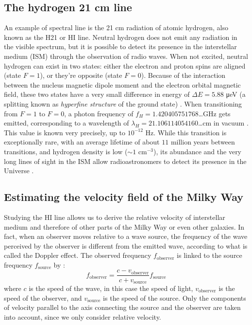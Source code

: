 \subsection{The hydrogen 21 cm line}
An example of spectral line is the 21 cm radiation of atomic hydrogen, also known as the H21 or HI line.
Neutral hydrogen does not emit any radiation in the visible spectrum, but it is possible to detect its presence in the interstellar medium (ISM) through the observation of radio waves.
When not excited, neutral hydrogen can exist in two states: either the electron and proton spins are aligned (state $F=1$), or they're opposite (state $F=0$).
Because of the interaction between the nucleus magnetic dipole moment and the electron orbital magnetic field, these two states have a very small difference in energy of $\Delta E = 5.88$ \si{\micro\electronvolt} (a splitting known as \emph{hyperfine structure} of the ground state) \cite{lauterbach_radio_2022}.
When transitioning from $F=1$ to $F=0$, a photon frequency of \mbox{$f_H = 1.420405751768$\ldots GHz} gets emitted, corresponding to a wavelength of \mbox{$\lambda_H = 21.106114054160$\ldots cm} in vacuum \cite{hellwig_measurement_1970}. This value is known very precisely, up to $10^{-12}$ Hz.
While this transition is exceptionally rare, with an average lifetime of about $11$ million years between transitions, and hydrogen density is low ($\sim 1$ cm$^{-3}$), its abundance and the very long lines of sight in the ISM allow radioastronomers to detect its presence in the Universe \cite{burke_introduction_2013}.

\subsection{Estimating the velocity field of the Milky Way}
Studying the HI line allows us to derive the relative velocity of interstellar medium and therefore of other parts of the Milky Way or even other galaxies.
In fact, when an observer moves relative to a wave source, the frequency of the wave perceived by the observer is different from the emitted wave, according to what is called the Doppler effect.
The observed frequency $f_\textrm{observer}$ is linked to the source frequency $f_\textrm{source}$ by \cite{alonso_fundamental_1983}:
\begin{equation}
    f_\textrm{observer} = \frac{c - v_\textrm{observer}}{c + v_\textrm{source}} f_\textrm{source}
    \label{eq:doppler_general}
\end{equation}
where $c$ is the speed of the wave, in this case the speed of light, $v_\textrm{observer}$ is the speed of the observer, and $v_\textrm{source}$ is the speed of the source.
Only the components of velocity parallel to the axis connecting the source and the observer are taken into account, since we only consider relative velocity.


